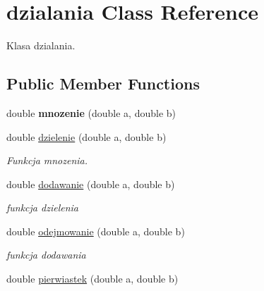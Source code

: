 \hypertarget{classdzialania}{\section{dzialania Class Reference}
\label{classdzialania}
}


Klasa dzialania.  


\subsection*{Public Member Functions}
\begin{DoxyCompactItemize}
\item 
\hypertarget{classdzialania_a5789152d0cae6fcd0efcd80a97317b7a}{double {\bfseries mnozenie} (double a, double b)}\label{classdzialania_a5789152d0cae6fcd0efcd80a97317b7a}

\item 
\hypertarget{classdzialania_a7989524b1d5dabb6f7e798c2658dfe92}{double \hyperlink{classdzialania_a7989524b1d5dabb6f7e798c2658dfe92}{dzielenie} (double a, double b)}\label{classdzialania_a7989524b1d5dabb6f7e798c2658dfe92}

\begin{DoxyCompactList}\small\item\em Funkcja mnozenia. \end{DoxyCompactList}\item 
\hypertarget{classdzialania_aedd526ca5c15cc5afa5dac56559b6d52}{double \hyperlink{classdzialania_aedd526ca5c15cc5afa5dac56559b6d52}{dodawanie} (double a, double b)}\label{classdzialania_aedd526ca5c15cc5afa5dac56559b6d52}

\begin{DoxyCompactList}\small\item\em funkcja dzielenia \end{DoxyCompactList}\item 
\hypertarget{classdzialania_a26c19288a004b2938cc41c72921d09ee}{double \hyperlink{classdzialania_a26c19288a004b2938cc41c72921d09ee}{odejmowanie} (double a, double b)}\label{classdzialania_a26c19288a004b2938cc41c72921d09ee}

\begin{DoxyCompactList}\small\item\em funkcja dodawania \end{DoxyCompactList}\item 
\hypertarget{classdzialania_a88e66bf8dc5e38da26b8beb3a7c3e268}{double \hyperlink{classdzialania_a88e66bf8dc5e38da26b8beb3a7c3e268}{pierwiastek} (double a, double b)}\label{classdzialania_a88e66bf8dc5e38da26b8beb3a7c3e268}


\end{DoxyCompactItemize}
